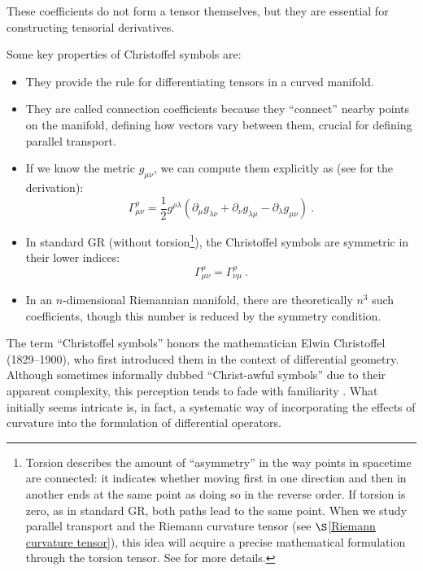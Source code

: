 These coefficients do not form a tensor themselves, but they are essential for constructing tensorial derivatives.

Some key properties of Christoffel symbols are:
\begin{itemize}
    \item They provide the rule for differentiating tensors in a curved manifold.
    \item They are called connection coefficients because they ``connect'' nearby points on the manifold, defining how vectors vary between them, crucial for defining parallel transport.
    \item If we know the metric $g_{\mu\nu}$, we can compute them explicitly as (see \cite{llibretheoreticalminimum} for the derivation):
    \begin{equation}
    \Gamma^\rho_{\mu\nu} = \frac{1}{2} g^{\rho\lambda} \left( \partial_\mu g_{\lambda\nu} + \partial_\nu g_{\lambda\mu} - \partial_\lambda g_{\mu\nu} \right) \ .
    \end{equation}
    \item In standard GR (without torsion\footnote{Torsion describes the amount of “asymmetry” in the way points in spacetime are connected: it indicates whether moving first in one direction and then in another ends at the same point as doing so in the reverse order. If torsion is zero, as in standard GR, both paths lead to the same point. When we study parallel transport and the Riemann curvature tensor (see $\S$\ref{Riemann curvature tensor}), this idea will acquire a precise mathematical formulation through the torsion tensor. See \cite{LlibreBertJanssen, torsion} for more details.}), the Christoffel symbols are symmetric in their lower indices:
    \begin{equation}
        \Gamma^\rho_{\mu\nu} = \Gamma^\rho_{\nu\mu} \ .
    \end{equation}
    \item In an $n$-dimensional Riemannian manifold, there are theoretically $n^3$ such coefficients, though this number is reduced by the symmetry condition.
\end{itemize}

The term ``Christoffel symbols'' honors the mathematician Elwin Christoffel (1829--1900), who first introduced them in the context of differential geometry. Although sometimes informally dubbed ``Christ-awful symbols'' due to their apparent complexity, this perception tends to fade with familiarity \cite{llibretheoreticalminimum}. What initially seems intricate is, in fact, a systematic way of incorporating the effects of curvature into the formulation of differential operators. 


